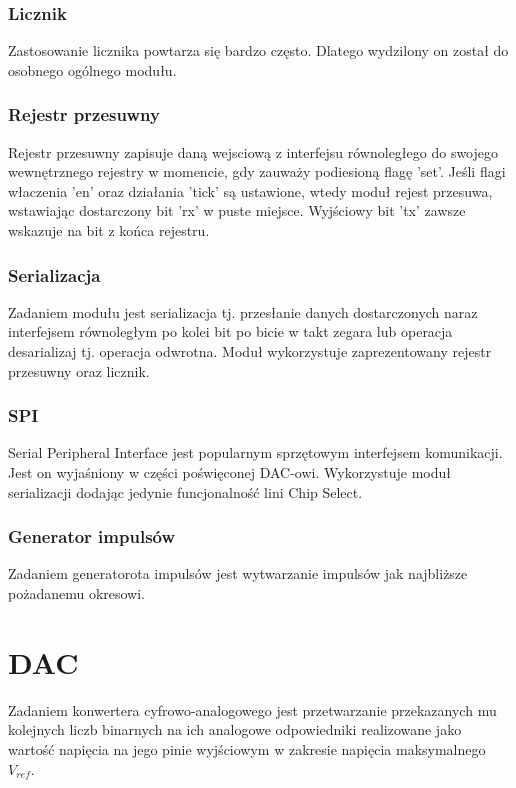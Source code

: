 \documentclass[a4paper,12pt]{article}
\begin{document}
\subsubsection{Licznik}
Zastosowanie licznika powtarza się bardzo często. Dlatego wydzilony on został do osobnego ogólnego modułu.


\subsubsection{Rejestr przesuwny}
Rejestr przesuwny zapisuje daną wejsciową z interfejsu równoległego do swojego wewnętrznego rejestry w momencie, gdy zauważy podiesioną flagę 'set'. Jeśli flagi właczenia 'en' oraz działania 'tick' są ustawione, wtedy moduł rejest przesuwa, wstawiając dostarczony bit 'rx' w puste miejsce. Wyjściowy bit 'tx' zawsze wskazuje na bit z końca rejestru.


\subsubsection{Serializacja}
Zadaniem modułu jest serializacja tj. przesłanie danych dostarczonych naraz interfejsem równoległym po kolei bit po bicie w takt zegara lub operacja desarializaj tj. operacja odwrotna. Moduł wykorzystuje zaprezentowany rejestr przesuwny oraz licznik.


\subsubsection{SPI}
Serial Peripheral Interface jest popularnym sprzętowym interfejsem komunikacji. Jest on wyjaśniony w części poświęconej DAC-owi. Wykorzystuje moduł serializacji dodając jedynie funcjonalność lini Chip Select.


\subsubsection{Generator impulsów}
Zadaniem generatorota impulsów jest wytwarzanie impulsów jak najbliższe pożadanemu okresowi.


\newpage
\section{DAC}
Zadaniem konwertera cyfrowo-analogowego jest przetwarzanie przekazanych mu kolejnych liczb binarnych na ich analogowe odpowiedniki realizowane jako wartość napięcia na jego pinie wyjściowym w zakresie napięcia maksymalnego $V_{ref}$.
\end{document}
